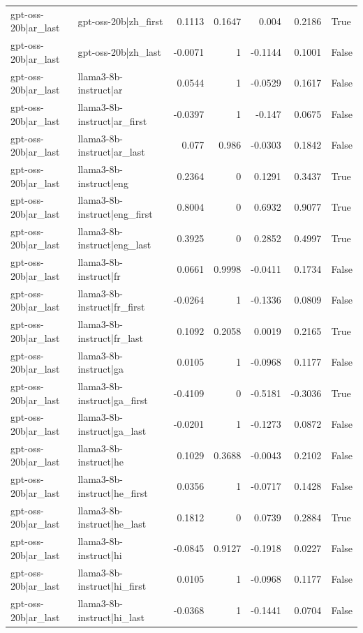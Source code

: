 \begin{table}
\begin{tabular}{l l r r r r l}
gpt-oss-20b|ar_last & gpt-oss-20b|zh_first & 0.1113 & 0.1647 & 0.004 & 0.2186 & True \\
gpt-oss-20b|ar_last & gpt-oss-20b|zh_last & -0.0071 & 1 & -0.1144 & 0.1001 & False \\
gpt-oss-20b|ar_last & llama3-8b-instruct|ar & 0.0544 & 1 & -0.0529 & 0.1617 & False \\
gpt-oss-20b|ar_last & llama3-8b-instruct|ar_first & -0.0397 & 1 & -0.147 & 0.0675 & False \\
gpt-oss-20b|ar_last & llama3-8b-instruct|ar_last & 0.077 & 0.986 & -0.0303 & 0.1842 & False \\
gpt-oss-20b|ar_last & llama3-8b-instruct|eng & 0.2364 & 0 & 0.1291 & 0.3437 & True \\
gpt-oss-20b|ar_last & llama3-8b-instruct|eng_first & 0.8004 & 0 & 0.6932 & 0.9077 & True \\
gpt-oss-20b|ar_last & llama3-8b-instruct|eng_last & 0.3925 & 0 & 0.2852 & 0.4997 & True \\
gpt-oss-20b|ar_last & llama3-8b-instruct|fr & 0.0661 & 0.9998 & -0.0411 & 0.1734 & False \\
gpt-oss-20b|ar_last & llama3-8b-instruct|fr_first & -0.0264 & 1 & -0.1336 & 0.0809 & False \\
gpt-oss-20b|ar_last & llama3-8b-instruct|fr_last & 0.1092 & 0.2058 & 0.0019 & 0.2165 & True \\
gpt-oss-20b|ar_last & llama3-8b-instruct|ga & 0.0105 & 1 & -0.0968 & 0.1177 & False \\
gpt-oss-20b|ar_last & llama3-8b-instruct|ga_first & -0.4109 & 0 & -0.5181 & -0.3036 & True \\
gpt-oss-20b|ar_last & llama3-8b-instruct|ga_last & -0.0201 & 1 & -0.1273 & 0.0872 & False \\
gpt-oss-20b|ar_last & llama3-8b-instruct|he & 0.1029 & 0.3688 & -0.0043 & 0.2102 & False \\
gpt-oss-20b|ar_last & llama3-8b-instruct|he_first & 0.0356 & 1 & -0.0717 & 0.1428 & False \\
gpt-oss-20b|ar_last & llama3-8b-instruct|he_last & 0.1812 & 0 & 0.0739 & 0.2884 & True \\
gpt-oss-20b|ar_last & llama3-8b-instruct|hi & -0.0845 & 0.9127 & -0.1918 & 0.0227 & False \\
gpt-oss-20b|ar_last & llama3-8b-instruct|hi_first & 0.0105 & 1 & -0.0968 & 0.1177 & False \\
gpt-oss-20b|ar_last & llama3-8b-instruct|hi_last & -0.0368 & 1 & -0.1441 & 0.0704 & False \\

\end{tabular}
\end{table}
